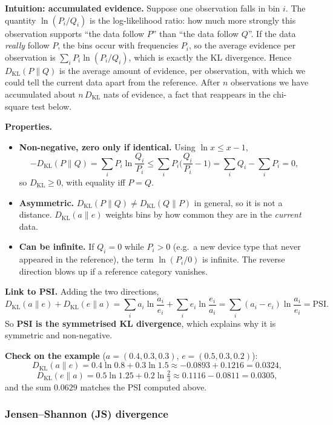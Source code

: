 \documentclass[11pt]{article}
\begin{document}
\textbf{Intuition: accumulated evidence.} Suppose one observation falls in bin \(i\). The quantity \(\ln(P_i/Q_i)\) is the log-likelihood ratio: how much more strongly this observation supports ``the data follow \(P\)'' than ``the data follow \(Q\)''. If the data \emph{really} follow \(P\), the bins occur with frequencies \(P_i\), so the average evidence per observation is \(\sum_iP_i\ln(P_i/Q_i)\), which is exactly the KL divergence. Hence \(D_{\mathrm{KL}}(P\|Q)\) is the average amount of evidence, per observation, with which we could tell the current data apart from the reference. After \(n\) observations we have accumulated about \(n\,D_{\mathrm{KL}}\) nats of evidence, a fact that reappears in the chi-square test below.

\textbf{Properties.}
\begin{itemize}
    \item \textbf{Non-negative, zero only if identical.} Using \(\ln x\le x-1\),
    \[
    -D_{\mathrm{KL}}(P\|Q)=\sum_iP_i\ln\frac{Q_i}{P_i}\le\sum_iP_i\Big(\frac{Q_i}{P_i}-1\Big)=\sum_iQ_i-\sum_iP_i=0,
    \]
    so \(D_{\mathrm{KL}}\ge0\), with equality iff \(P=Q\).
    \item \textbf{Asymmetric.} \(D_{\mathrm{KL}}(P\|Q)\neq D_{\mathrm{KL}}(Q\|P)\) in general, so it is not a distance. \(D_{\mathrm{KL}}(a\|e)\) weights bins by how common they are in the \emph{current} data.
    \item \textbf{Can be infinite.} If \(Q_i=0\) while \(P_i>0\) (e.g.\ a new device type that never appeared in the reference), the term \(\ln(P_i/0)\) is infinite. The reverse direction blows up if a reference category vanishes.
\end{itemize}

\textbf{Link to PSI.} Adding the two directions,
\[
D_{\mathrm{KL}}(a\|e)+D_{\mathrm{KL}}(e\|a)=\sum_ia_i\ln\frac{a_i}{e_i}+\sum_ie_i\ln\frac{e_i}{a_i}=\sum_i(a_i-e_i)\ln\frac{a_i}{e_i}=\mathrm{PSI}.
\]
So \textbf{PSI is the symmetrised KL divergence}, which explains why it is symmetric and non-negative.

\textbf{Check on the example} (\(a=(0.4,0.3,0.3)\), \(e=(0.5,0.3,0.2)\)):
\[
D_{\mathrm{KL}}(a\|e)=0.4\ln0.8+0.3\ln1.5\approx-0.0893+0.1216=0.0324,
\]
\[
D_{\mathrm{KL}}(e\|a)=0.5\ln1.25+0.2\ln\tfrac{2}{3}\approx0.1116-0.0811=0.0305,
\]
and the sum \(0.0629\) matches the PSI computed above.

\subsubsection{Jensen--Shannon (JS) divergence}
\end{document}

